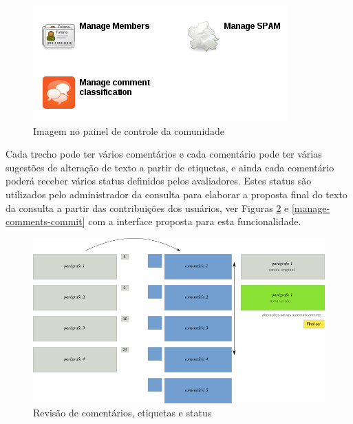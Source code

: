 \documentclass[12pt]{article}
\begin{document}
\begin{figure}[h]
\center
\includegraphics[scale=0.5]{control-panel.png}
\caption{Imagem no painel de controle da comunidade}
\label{control-panel}
\end{figure}

Cada trecho pode ter vários comentários e cada comentário pode ter várias
sugestões de alteração de texto a partir de etiquetas, e ainda cada comentário
poderá receber vários status definidos pelos avaliadores. Estes status são
utilizados pelo administrador da consulta para elaborar a proposta final do
texto da consulta a partir das contribuições dos usuários, ver Figuras
\ref{manage-comments} e \ref{manage-comments-commit} com a interface proposta
para esta funcionalidade.

\begin{figure}[h]
\center
\includegraphics[scale=0.3]{manage-comments.png}
\caption{Revisão de comentários, etiquetas e status}
\label{manage-comments}
\end{figure}
\end{document}
